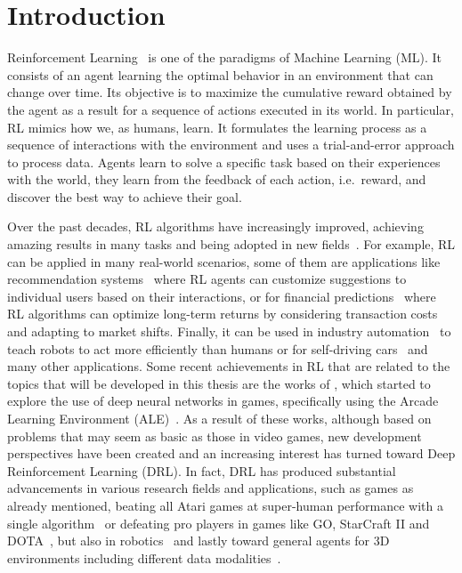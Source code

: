 
\chapter{Introduction}
\label{ch:introduction}
Reinforcement Learning~\citep{sutton1998introduction} is one of the paradigms of Machine Learning (ML).
It consists of an agent learning the optimal behavior in an environment that can change over time.
Its objective is to maximize the cumulative reward obtained by the agent as a result for a sequence of actions executed in its world.
In particular, RL mimics how we, as humans, learn.
It formulates the learning process as a sequence of interactions with the environment and uses a trial-and-error approach to process data.
Agents learn to solve a specific task based on their experiences with the world, they learn from the feedback of each action, i.e.\ reward, and discover the best way to achieve their goal.

Over the past decades, RL algorithms have increasingly improved, achieving amazing results in many tasks and being adopted in new fields~\citep{li2017deep, zhang2020deep}.
For example, RL can be applied in many real-world scenarios, some of them are applications like recommendation systems~\citep{zhao2019deep} where RL agents can customize suggestions to individual users based on their interactions, or for financial predictions~\citep{zhang2019deep} where RL algorithms can optimize long-term returns by considering transaction costs and adapting to market shifts.
Finally, it can be used in industry automation~\citep{levine2018learning} to teach robots to act more efficiently than humans or for self-driving cars~\citep{kiran2021deep} and many other applications.
Some recent achievements in RL that are related to the topics that will be developed in this thesis are
the works of \citet{mnih2013playing, mnih2015human}, which started to explore the use of deep neural networks in games, specifically using the Arcade Learning Environment (ALE)~\citep{bellemare2013atari}.
As a result of these works, although based on problems that may seem as basic as those in video games, new development perspectives have been created and an increasing interest has turned toward Deep Reinforcement Learning (DRL).
In fact, DRL has produced substantial advancements in various research fields and applications, such as games as already mentioned, beating all Atari games at super-human performance with a single algorithm~\citep{agent57} or defeating pro players in games like GO, StarCraft II and DOTA~\citep{alphago, starcraft, dota}, but also in robotics~\citep{rlrob, bousmalis2023robocat} and lastly toward general agents for 3D environments including different data modalities~\citep{sima2024}.

